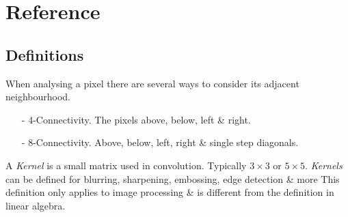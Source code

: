 \documentclass[11pt,a4paper]{article}
\begin{document}
\newpage
\setcounter{section}{-1}

\section{Reference}

\subsection{Definitions}

When analysing a pixel there are several ways to consider its adjacent neighbourhood.
\begin{itemize}
	\item[-] 4-Connectivity. The pixels above, below, left \& right.
	\item[-] 8-Connectivity. Above, below, left, right \& single step diagonals.
\end{itemize}

A \textit{Kernel} is a small matrix used in convolution. Typically $3\times3$ or $5\times5$. \textit{Kernels} can be defined for blurring, sharpening, embossing, edge detection \& more
\nb This definition only applies to image processing \& is different from the definition in linear algebra.
\end{document}
